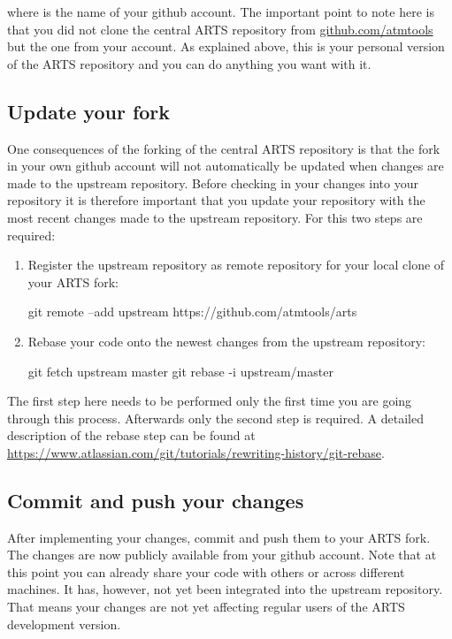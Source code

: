 where  is the name of your github account. The
important point to note here is that you did not clone the central ARTS
repository from \url{github.com/atmtools} but the one from your account. As
explained above, this is your personal version of the ARTS repository
and you can do anything you want with it.

\subsection{Update your fork}

One consequences of the forking of the central ARTS repository is that the
fork in your own github account will not automatically be updated when
changes are made to the upstream repository. Before checking in your changes
into your repository it is therefore important that you update your repository
with the most recent changes made to the upstream repository. For this two
steps are required:

\begin{enumerate}
\item Register the upstream repository as remote repository for your local clone of your ARTS fork:
  \begin{code}
    git remote --add upstream https://github.com/atmtools/arts
  \end{code}
\item Rebase your code onto the newest changes from the upstream repository:
  \begin{code}
    git fetch upstream master
    git rebase -i upstream/master
  \end{code}
\end{enumerate}

The first step here needs to be performed only the first time you are going
through this process. Afterwards only the second step is required. A detailed
description of the rebase step can be found at \url{https://www.atlassian.com/git/tutorials/rewriting-history/git-rebase}.

\subsection{Commit and push your changes}

After implementing your changes, commit and push them to your ARTS fork. The
changes are now publicly available from your github account. Note that at this
point you can already share your code with others or across different machines.
It has, however, not yet been integrated into the upstream repository. That
means your changes are not yet affecting regular users of the ARTS development
version.

